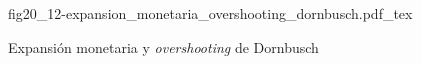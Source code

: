 \begin{figure}[h]
\centering
\def\svgwidth{0.5\textwidth}
{fig20_12-expansion_monetaria_overshooting_dornbusch.pdf_tex}
\caption{Expansión monetaria y \textit{overshooting} de Dornbusch}
\label{fig20_12-expansion_monetaria_overshooting_dornbusch}
\end{figure}